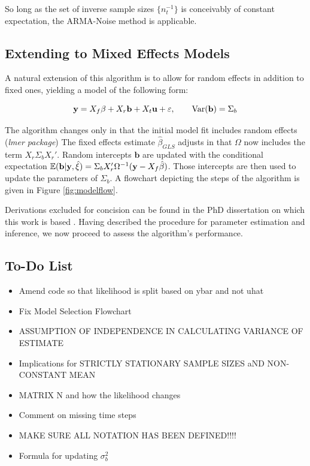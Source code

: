 So long as the set of inverse sample sizes $\{n_t^{-1}\}$ is conceivably of constant expectation, the ARMA-Noise method is applicable.




\subsection{Extending to Mixed Effects Models}

A natural extension of this algorithm is to allow for random effects in addition to fixed ones,
yielding a model of the following form:

\begin{equation}
    \mathbf{y} = X_f\beta + X_r\mathbf{b} + X_t\mathbf{u} + \varepsilon, \qquad     \text{Var}(\mathbf{b}) = \Sigma_b
\end{equation}






The algorithm changes only in that the initial model fit includes random effects (\textit{lmer package})
The fixed effects estimate $\hat{\beta}_{GLS}$ adjusts in that $\Omega$ now includes the 
term $X_r\Sigma_bX_r'$. Random intercepts $\mathbf{b}$ are updated with the 
conditional expectation $\mathbb{E}(\mathbf{b}|\mathbf{y}, \hat{\xi}) = \Sigma_b X_r' \Omega^{-1}(\mathbf{y} - X_f\hat{\beta})$.
Those intercepts are then used to update the parameters of $\Sigma_b$. A flowchart depicting the steps of the algorithm is given in 
Figure \ref{fig:modelflow}.


\medskip




Derivations excluded for concision can be found in the PhD dissertation on which this work
is based \cite{Argentino2026}. Having described the procedure for parameter estimation and
inference, we now proceed to assess the algorithm's performance.


\subsection{To-Do List}
\begin{itemize}
    \item Amend code so that likelihood is split based on ybar and not uhat
    \item Fix Model Selection Flowchart
    \item ASSUMPTION OF INDEPENDENCE IN CALCULATING VARIANCE OF ESTIMATE
    \item Implications for STRICTLY STATIONARY SAMPLE SIZES aND NON-CONSTANT MEAN
    \item MATRIX N and how the likelihood changes 
    \item Comment on missing time steps
    \item MAKE SURE ALL NOTATION HAS BEEN DEFINED!!!!
    \item Formula for updating $\sigma_b^2$
\end{itemize}